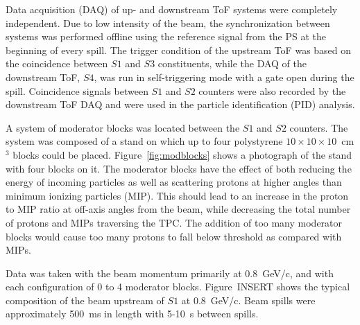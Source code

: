     
    Data acquisition (DAQ) of up- and downstream ToF systems were completely independent. Due to low intensity of the beam, the synchronization between systems was performed offline using the reference signal from the PS at the beginning of every spill. The trigger condition of the upstream ToF was based on the coincidence between $S1$ and $S3$ constituents, while the DAQ of the downstream ToF, $S4$, was run in self-triggering mode with a gate open during the spill. Coincidence signals between $S1$ and $S2$ counters were also recorded by the downstream ToF DAQ and were used in the particle identification (PID) analysis. 
    
    
    A system of moderator blocks was located between the $S1$ and $S2$ counters.  The system was composed of a stand on which up to four polystyrene $10\times10\times10$~cm$^3$ blocks could be placed. Figure~\ref{fig:modblocks} shows a photograph of the stand with four blocks on it. The moderator blocks have the effect of both reducing the energy of incoming particles as well as scattering protons at higher angles than minimum ionizing particles (MIP). This should lead to an  increase in the proton to MIP ratio at off-axis angles from the beam, while decreasing the total number of protons and MIPs traversing the TPC. The addition of too many moderator blocks would cause too many protons to fall below threshold as compared with MIPs.
    
    Data was taken with the beam momentum primarily at 0.8~GeV/c, and with each configuration of 0 to 4 moderator blocks. Figure~INSERT shows the typical composition of the beam upstream of $S1$ at 0.8~GeV/c. Beam spills were approximately 500~ms in length with 5-10~s between spills.  
    
    
